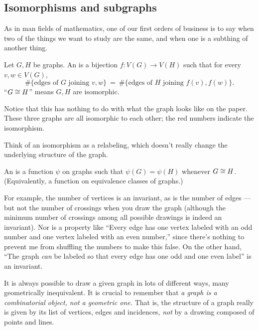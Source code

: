 \subsection{Isomorphisms and subgraphs}

As in man fields of mathematics, one of our first orders of business is to say when two of the things we want to study are the same, and when one is a subthing of another thing.

\begin{definition}
Let $G,H$ be graphs.  An  is a bijection $f: V(G) \to V(H)$ such that for every $v,w \in V(G)$,
\[\#\{\text{edges of $G$ joining } v,w\} ~=~ \#\{\text{edges of $H$ joining } f(v),f(w)\}.\]
``$G \cong H$'' means $G,H$ are isomorphic.
\end{definition}

Notice that this has nothing to do with what the graph looks like on the paper.    These three graphs are all isomorphic to each other; the red numbers indicate the isomorphism.


Think of an isomorphism as a relabeling, which doesn't really change the underlying structure of the graph.

\begin{definition}
 An  is a function $\psi$ on graphs such that $\psi(G)=\psi(H)$ whenever $G \cong H$.  (Equivalently, a function on equivalence classes of graphs.)
\end{definition}

For example, the number of vertices is an invariant, as is the number of edges --- but not the number of crossings when you draw the graph (although the minimum number of crossings among all possible drawings is indeed an invariant).  Nor is a property like ``Every edge has one vertex labeled with an odd number and one vertex labeled with an even number,'' since there's nothing to prevent me from shuffling the numbers to make this false.  On the other hand, ``The graph \emph{can} be labeled so that every edge has one odd and one even label'' is an invariant.

It is always possible to draw a given graph in lots of different ways, many geometrically inequivalent.  It is crucial to remember that \emph{a graph is a combinatorial object, not a geometric one.}  That is, the structure of a graph really is given by its list of vertices, edges and incidences, \emph{not} by a drawing composed of points and lines.

